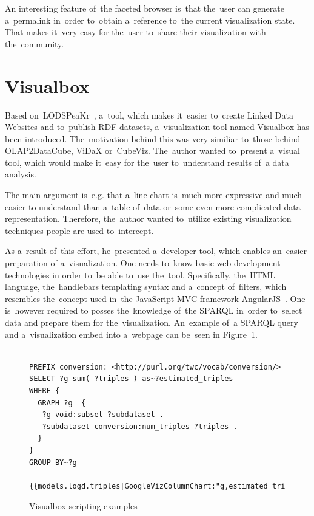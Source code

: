 An interesting feature of~the faceted browser is~that the~user can 
generate a~permalink in~order to~obtain a~reference to~the current visualization 
state. That makes it~very easy for the~user to~share their visualization with the~community.

\section{Visualbox}
Based on~LODSPeaKr~\cite{lodspeakr}, a~tool, which makes it~easier to~create Linked Data Websites 
and to~publish RDF datasets, a~visualization tool named Visualbox has been 
introduced. The~motivation behind this was very similiar to~those behind 
OLAP2DataCube, ViDaX or~CubeViz. The~author wanted to~present a~visual tool,
which would 
make it~easy for the~user to~understand results of~a data analysis.

The main argument is~e.g. that a~line chart is~much more expressive and much easier
to understand than a~table of~data or~some even more complicated data 
representation. Therefore, the~author wanted to~utilize existing visualization 
techniques people are used to~intercept.

As a~result of~this effort, he~presented a~developer tool, which enables an~easier preparation
of a~visualization. One needs to~know basic web development technologies 
in order to~be able to~use the~tool. Specifically, the~HTML language, the~handlebars templating syntax and a~concept of~filters, which resembles the~concept used in~the JavaScript MVC framework AngularJS~\cite{angularjs}. One is~however required
to posses the~knowledge of~the SPARQL in~order to~select data and prepare them for the~visualization. An~example of~a SPARQL query and a~visualization embed into a~webpage can be~seen
in Figure~\ref{visualbox-example}.

\begin{figure}
\scriptsize\begin{verbatim}

PREFIX conversion: <http://purl.org/twc/vocab/conversion/>
SELECT ?g sum( ?triples ) as~?estimated_triples
WHERE {
  GRAPH ?g  {
   ?g void:subset ?subdataset .
   ?subdataset conversion:num_triples ?triples .
  }
} 
GROUP BY~?g

{{models.logd.triples|GoogleVizColumnChart:"g,estimated_triples,width=1200"}}
\end{verbatim}\normalsize
\caption{Visualbox scripting examples}
\label{visualbox-example}
\end{figure}

